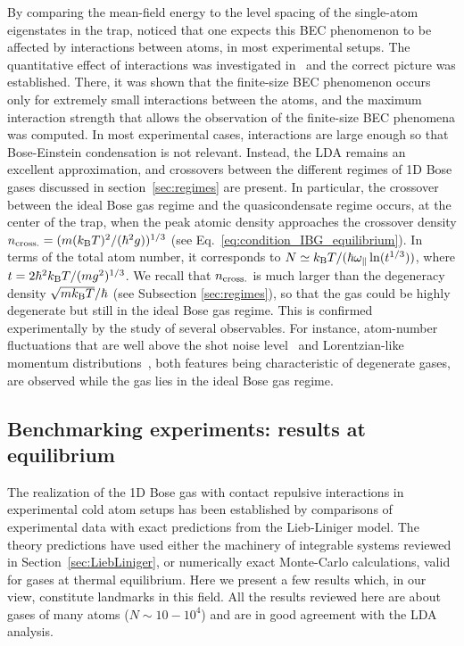 \documentclass[onecolumn,amsfonts,showpacs,superscriptaddress]{revtex4-1}
\begin{document}
By comparing the mean-field energy to the level spacing of the single-atom eigenstates in the trap, \cite{petrov_regimes_2000} noticed that
one expects this BEC phenomenon to 
be affected by interactions between atoms, 
in most experimental setups. 
The quantitative effect of interactions 
was investigated in~\citep{bouchoule_interaction-induced_2007} and the correct picture was established.
There, it was shown that the finite-size BEC phenomenon occurs only for extremely small interactions between the atoms, and the maximum interaction strength 
that allows the observation of the finite-size
BEC phenomena was computed. 
In most experimental cases, interactions are large enough so that Bose-Einstein condensation is not relevant. Instead, the LDA remains an excellent approximation, and 
crossovers between the different regimes of 1D Bose gases discussed in section~\ref{sec:regimes} are present. In particular, the crossover between the ideal Bose gas regime and the quasicondensate regime occurs, at the center of the trap, when the peak atomic density approaches the crossover density $n_{\rm cross.}= (m (k_{\rm B} T)^2 /(\hbar^2 g))^{1/3}$ (see Eq.~\eqref{eq:condition_IBG_equilibrium}).  In terms of the total atom number, it corresponds to $ N \simeq k_{\rm B} T /(\hbar \omega_\parallel \ln ( t^{1/3}))$, where 
$t=2\hbar^2k_{\rm B} T/(mg^2)^{1/3}$.
We recall that $n_{\rm cross.}$ is much 
larger than the degeneracy density $\sqrt{mk_{\rm B} T}/\hbar$ (see Subsection \ref{sec:regimes}), so that the gas could be highly degenerate but still in the ideal Bose gas regime. This is confirmed experimentally by the study of several observables. For instance, atom-number fluctuations that are well above the shot noise level~\citep{armijo_mapping_2011} and Lorentzian-like momentum distributions~\citep{jacqmin_momentum_2012}, both features being characteristic of degenerate gases, are observed while the gas lies
in the ideal Bose gas regime.


\subsection{Benchmarking experiments: results at equilibrium}
\label{subsec:benchmarkingexp}
The realization of the 1D Bose gas with contact repulsive interactions in
experimental cold atom setups has been established
by comparisons of experimental data with exact predictions from the Lieb-Liniger model. The theory predictions have used either 
the machinery of integrable systems reviewed in Section~\ref{sec:LiebLiniger}, or numerically exact Monte-Carlo calculations, valid for gases at thermal equilibrium. Here we present a few results which, in our view,
constitute landmarks in this field. All the results reviewed here are about gases of many atoms ($N \sim 10- 10^4$) and are in good agreement with the LDA analysis.
\end{document}
